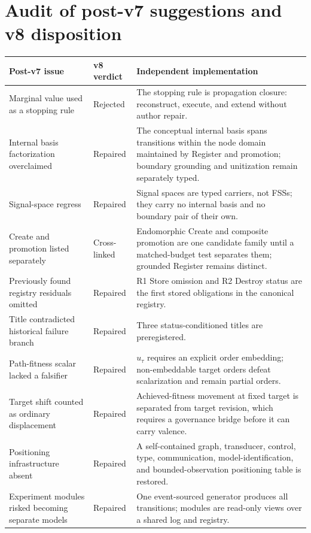 \documentclass[11pt]{article}
\begin{document}
\section{Audit of post-v7 suggestions and v8 disposition}

\begin{longtable}{p{}p{}p{}}
\toprule
\textbf{Post-v7 issue} & \textbf{v8 verdict} & \textbf{Independent implementation}\\
\midrule\endhead
Marginal value used as a stopping rule & Rejected & The stopping rule is propagation closure: reconstruct, execute, and extend without author repair.\\
Internal basis factorization overclaimed & Repaired & The conceptual internal basis spans transitions within the node domain maintained by Register and promotion; boundary grounding and unitization remain separately typed.\\
Signal-space regress & Repaired & Signal spaces are typed carriers, not FSSs; they carry no internal basis and no boundary pair of their own.\\
Create and promotion listed separately & Cross-linked & Endomorphic Create and composite promotion are one candidate family until a matched-budget test separates them; grounded Register remains distinct.\\
Previously found registry residuals omitted & Repaired & R1 Store omission and R2 Destroy status are the first stored obligations in the canonical registry.\\
Title contradicted historical failure branch & Repaired & Three status-conditioned titles are preregistered.\\
Path-fitness scalar lacked a falsifier & Repaired & $u_\tau$ requires an explicit order embedding; non-embeddable target orders defeat scalarization and remain partial orders.\\
Target shift counted as ordinary displacement & Repaired & Achieved-fitness movement at fixed target is separated from target revision, which requires a governance bridge before it can carry valence.\\
Positioning infrastructure absent & Repaired & A self-contained graph, transducer, control, type, communication, model-identification, and bounded-observation positioning table is restored.\\
Experiment modules risked becoming separate models & Repaired & One event-sourced generator produces all transitions; modules are read-only views over a shared log and registry.\\

\end{longtable}
\end{document}
